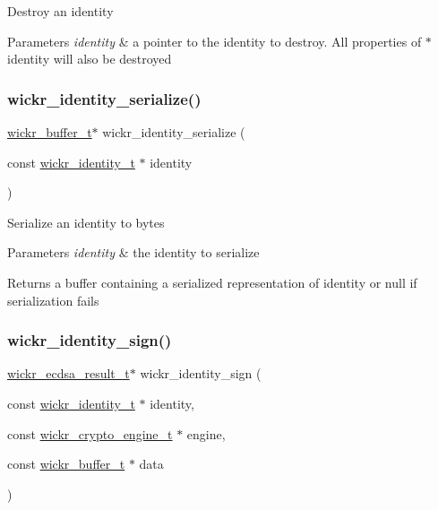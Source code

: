 Destroy an identity


\begin{DoxyParams}{Parameters}
{\em identity} & a pointer to the identity to destroy. All properties of \textquotesingle{}$\ast$identity\textquotesingle{} will also be destroyed \\
\hline
\end{DoxyParams}
\mbox{\label{group__wickr__identity_ga79ca0713d0b90873e584379f26cbd051}} 
\subsubsection{\texorpdfstring{wickr\+\_\+identity\+\_\+serialize()}{wickr\_identity\_serialize()}}
{\footnotesize\ttfamily \mbox{\hyperlink{structwickr__buffer}{wickr\+\_\+buffer\+\_\+t}}$\ast$ wickr\+\_\+identity\+\_\+serialize (\begin{DoxyParamCaption}\item[{const \mbox{\hyperlink{structwickr__identity}{wickr\+\_\+identity\+\_\+t}} $\ast$}]{identity }\end{DoxyParamCaption})}

Serialize an identity to bytes


\begin{DoxyParams}{Parameters}
{\em identity} & the identity to serialize \\
\hline
\end{DoxyParams}
\begin{DoxyReturn}{Returns}
a buffer containing a serialized representation of \textquotesingle{}identity\textquotesingle{} or null if serialization fails 
\end{DoxyReturn}
\mbox{\label{group__wickr__identity_ga32097764e57e70d85a2e1277146495c9}} 
\subsubsection{\texorpdfstring{wickr\+\_\+identity\+\_\+sign()}{wickr\_identity\_sign()}}
{\footnotesize\ttfamily \mbox{\hyperlink{structwickr__ecdsa__result}{wickr\+\_\+ecdsa\+\_\+result\+\_\+t}}$\ast$ wickr\+\_\+identity\+\_\+sign (\begin{DoxyParamCaption}\item[{const \mbox{\hyperlink{structwickr__identity}{wickr\+\_\+identity\+\_\+t}} $\ast$}]{identity,  }\item[{const \mbox{\hyperlink{structwickr__crypto__engine}{wickr\+\_\+crypto\+\_\+engine\+\_\+t}} $\ast$}]{engine,  }\item[{const \mbox{\hyperlink{structwickr__buffer}{wickr\+\_\+buffer\+\_\+t}} $\ast$}]{data }\end{DoxyParamCaption})}

